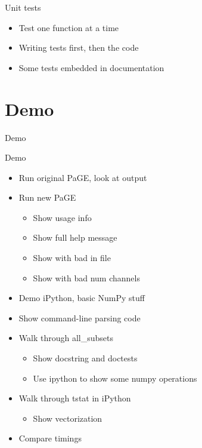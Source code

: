 \documentclass{beamer}
\begin{document}
\begin{frame}{Unit tests}
  \begin{itemize}
  \item Test one function at a time
  \item Writing tests first, then the code
  \item Some tests embedded in documentation
  \end{itemize}  
\end{frame}

\section{Demo}
\begin{frame}
  \begin{centering}
    \Large{Demo}        
  \end{centering}
\end{frame}


\begin{frame}{Demo}
  \begin{itemize}
  \item Run original PaGE, look at output
  \item Run new PaGE
    \begin{itemize}
    \item Show usage info
    \item Show full help message
    \item Show with bad in file
    \item Show with bad num channels
    \end{itemize}
  \item Demo iPython, basic NumPy stuff
  \item Show command-line parsing code
  \item Walk through all\_subsets
    \begin{itemize}
    \item Show docstring and doctests
    \item Use ipython to show some numpy operations
    \end{itemize}
  \item Walk through tstat in iPython
    \begin{itemize}
    \item Show vectorization
    \end{itemize}
  \item Compare timings
  \end{itemize}
\end{frame}
\end{document}
